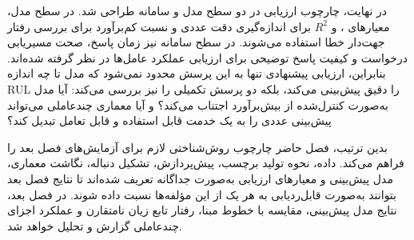 در نهایت، چارچوب ارزیابی در دو سطح مدل و سامانه طراحی شد. در
سطح مدل، معیارهای ،  و $R^2$ برای اندازه‌گیری
دقت عددی و نسبت کم‌برآورد برای بررسی رفتار
جهت‌دار خطا استفاده می‌شوند. در سطح سامانه نیز زمان پاسخ،
صحت مسیریابی درخواست و کیفیت پاسخ توضیحی برای ارزیابی عملکرد
عامل‌ها در نظر گرفته شده‌اند. بنابراین، ارزیابی پیشنهادی تنها
به این پرسش محدود نمی‌شود که مدل تا چه اندازه \gls{RUL} را
دقیق پیش‌بینی می‌کند، بلکه دو پرسش تکمیلی را نیز بررسی می‌کند:
آیا مدل به‌صورت کنترل‌شده از بیش‌برآورد اجتناب می‌کند؟ و آیا
معماری چندعاملی می‌تواند پیش‌بینی عددی را به یک خدمت قابل
استفاده و قابل تعامل تبدیل کند؟

بدین ترتیب، فصل حاضر چارچوب روش‌شناختی لازم برای آزمایش‌های فصل
بعد را فراهم می‌کند. داده، نحوه تولید برچسب، پیش‌پردازش، تشکیل
دنباله، نگاشت معماری، مدل پیش‌بینی و معیارهای ارزیابی به‌صورت
جداگانه تعریف شده‌اند تا نتایج فصل بعد بتوانند به‌صورت
قابل‌ردیابی به هر یک از این مؤلفه‌ها نسبت داده شوند. در فصل
بعد، نتایج مدل پیش‌بینی، مقایسه با خطوط مبنا، رفتار تابع زیان
نامتقارن و عملکرد اجزای چندعاملی گزارش و تحلیل خواهد شد.
